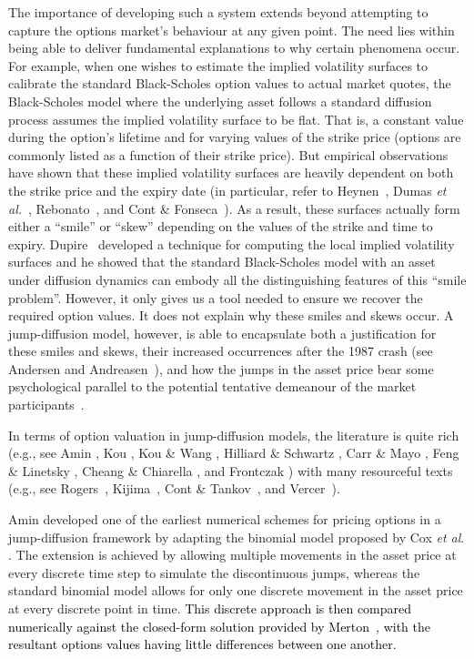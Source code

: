 The importance of developing such a system extends beyond attempting to capture the options market's behaviour at any given point. The need lies within being able to deliver fundamental explanations to why certain phenomena occur. For example, when one wishes to estimate the implied volatility surfaces to calibrate the standard Black-Scholes option values to actual market quotes, the Black-Scholes model where the underlying asset follows a standard diffusion process assumes the implied volatility surface to be flat. That is, a constant value during the option's lifetime and for varying values of the strike price (options are commonly listed as a function of their strike price). But empirical observations have shown that these implied volatility surfaces are heavily dependent on both the strike price and the expiry date (in particular, refer to Heynen~\cite{Heynen1994}, Dumas \emph{et al.}~\cite{Dumas1998}, Rebonato~\cite{Rebonato1999}, and Cont \& Fonseca~\cite{Cont2001, Cont2002}). As a result, these surfaces actually form either a ``smile'' or ``skew'' depending on the values of the strike and time to expiry. Dupire~\cite{Dupire1994} developed a technique for computing the local implied volatility surfaces and he showed that the standard Black-Scholes model with an asset under diffusion dynamics can embody all the distinguishing features of this ``smile problem''. However, it only gives us a tool needed to ensure we recover the required option values. It does not explain why these smiles and skews occur. A jump-diffusion model, however, is able to encapsulate both a justification for these smiles and skews, their increased occurrences after the 1987 crash (see Andersen and Andreasen~\cite{Andersen2000}), and how the jumps in the asset price bear some psychological parallel to the potential tentative demeanour of the market participants~\cite{Cont2004}.

In terms of option valuation in jump-diffusion models, the literature is quite rich (e.g., see Amin \cite{Armin1993}, Kou \cite{Kou2002}, Kou \& Wang \cite{Kou2004}, Hilliard \& Schwartz \cite{Hilliard2005}, Carr \& Mayo \cite{Carr2007}, Feng \& Linetsky \cite{Feng2008}, Cheang \& Chiarella \cite{Cheang2011}, and Frontczak \cite{Frontczak2013}) with many resourceful texts (e.g., see Rogers~\cite{Rogers1997}, Kijima~\cite{Kijima2002}, Cont \& Tankov~\cite{Cont2004}, and Vercer~\cite{Vecer2011}).

Amin \cite{Armin1993} developed one of the earliest numerical schemes for pricing options in a jump-diffusion framework by adapting the binomial model proposed by Cox \emph{et al}. \cite{Cox1979}. The extension is achieved by allowing multiple movements in the asset price at every discrete time step to simulate the discontinuous jumps, whereas the standard binomial model allows for only one discrete movement in the asset price at every discrete point in time. \textcolor{black}{This discrete approach is then compared numerically against the closed-form solution provided by Merton~\cite{Merton1976}, with the resultant options values having little differences between one another.}

